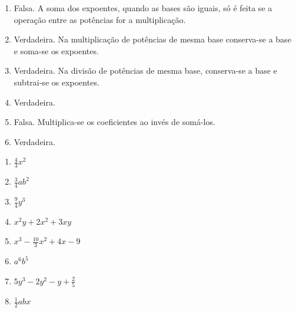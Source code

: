 \begin{respostas}{2}
    
    \ansitem{} \begin{enumerate}[label=\alph*)]
        \item Falsa. A soma dos expoentes, quando as bases são iguais, só é feita se a operação entre as potências for a multiplicação.
        
        \item Verdadeira. Na multiplicação de potências de mesma base conserva-se a base e soma-se os expoentes.
        
        \item Verdadeira. Na divisão de potências de mesma base, conserva-se a base e subtrai-se os expoentes.
        
        \item Verdadeira.
        
        \item Falsa. Multiplica-se os coeficientes ao invés de somá-los.
        
        \item Verdadeira.
    \end{enumerate}
    
    \ansitem{} \begin{multicols}{3}
        \begin{enumerate}[label=\alph*)]
            \item $\frac{4}{3}x^2$
            
            \item $\frac{3}{4}ab^2$
            
            \item $\frac{9}{4}y^3$
            
            \item $x^2y+2x^2+3xy$
            
            \item $x^3-\frac{10}{3}x^2+4x-9$
            
            \item $a^6b^5$
            
            \item $5y^3-2y^2-y+\frac{2}{5}$
            
            \item $\frac{1}{2}abx$
            

\end{enumerate}
\end{multicols}
\end{respostas}
